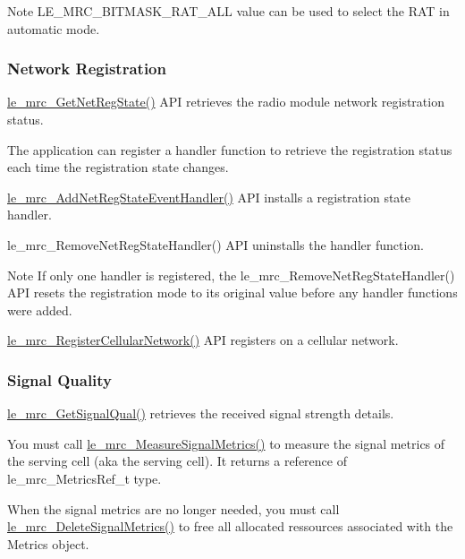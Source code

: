\begin{DoxyNote}{Note}
L\+E\+\_\+\+M\+R\+C\+\_\+\+B\+I\+T\+M\+A\+S\+K\+\_\+\+R\+A\+T\+\_\+\+A\+L\+L value can be used to select the R\+A\+T in automatic mode.
\end{DoxyNote}
\hypertarget{c_mrc_le_mrc_registration}{}\subsubsection{Network Registration}\label{c_mrc_le_mrc_registration}
\hyperlink{le__mrc__interface_8h_a4f11e27862fef384c0023f5b538e543d}{le\+\_\+mrc\+\_\+\+Get\+Net\+Reg\+State()} A\+P\+I retrieves the radio module network registration status.

The application can register a handler function to retrieve the registration status each time the registration state changes.

\hyperlink{le__mrc__interface_8h_a929745b84719754d28f539540f71a552}{le\+\_\+mrc\+\_\+\+Add\+Net\+Reg\+State\+Event\+Handler()} A\+P\+I installs a registration state handler.

le\+\_\+mrc\+\_\+\+Remove\+Net\+Reg\+State\+Handler() A\+P\+I uninstalls the handler function. \begin{DoxyNote}{Note}
If only one handler is registered, the le\+\_\+mrc\+\_\+\+Remove\+Net\+Reg\+State\+Handler() A\+P\+I resets the registration mode to its original value before any handler functions were added.
\end{DoxyNote}
\hyperlink{le__mrc__interface_8h_a578262185e6c0514e4ad5ba584c360ca}{le\+\_\+mrc\+\_\+\+Register\+Cellular\+Network()} A\+P\+I registers on a cellular network.\hypertarget{c_mrc_le_mrc_signal}{}\subsubsection{Signal Quality}\label{c_mrc_le_mrc_signal}
\hyperlink{le__mrc__interface_8h_a717aa0f4e4dc9a83b6adc2f26f3f0258}{le\+\_\+mrc\+\_\+\+Get\+Signal\+Qual()} retrieves the received signal strength details.

You must call \hyperlink{le__mrc__interface_8h_ad3662723a7ed47cf45d9a2eaaa1fb16e}{le\+\_\+mrc\+\_\+\+Measure\+Signal\+Metrics()} to measure the signal metrics of the serving cell (aka the \textquotesingle{}serving\textquotesingle{} cell). It returns a reference of le\+\_\+mrc\+\_\+\+Metrics\+Ref\+\_\+t type.

When the signal metrics are no longer needed, you must call \hyperlink{le__mrc__interface_8h_a20addd98ee6cb07f9ee1a45be01b5203}{le\+\_\+mrc\+\_\+\+Delete\+Signal\+Metrics()} to free all allocated ressources associated with the Metrics object.

